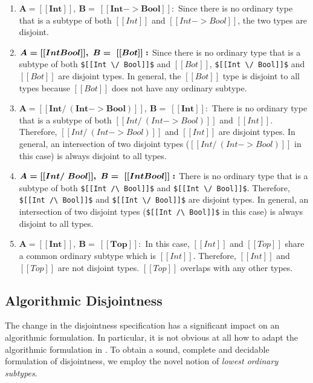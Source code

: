 \begin{enumerate}
  \item $\boldsymbol{A = [[Int]], \ B = \ [[Int -> Bool]]:}$ Since there is no ordinary type that is a subtype of both $[[Int]]$ and $[[Int -> Bool]]$,
        the two types are disjoint.
  \item $\boldsymbol{A = [[Int \/ Bool]], \ B = \ [[Bot]]:}$ Since there is no ordinary type that is a subtype of both \lstinline{$[[Int \/ Bool]]$} and $[[Bot]]$,
    \lstinline{$[[Int \/ Bool]]$} and $[[Bot]]$ are disjoint types.
    In general, the $[[Bot]]$ type is disjoint to all types because $[[Bot]]$ does not
    have any ordinary subtype.
 \item $\boldsymbol{A = [[Int /\ (Int -> Bool)]], \ B = \ [[Int]]:}$ There is no ordinary type that is a subtype of both $[[Int /\ (Int -> Bool)]]$ and $[[Int]]$.
       Therefore, $[[Int /\ (Int -> Bool)]]$ and $[[Int]]$ are disjoint types.
       In general, an intersection of two disjoint types ($[[Int /\ (Int -> Bool)]]$ in this case)
       is always disjoint to all types.
  \item $\boldsymbol{A = [[Int /\ Bool]], \ B = \ [[Int \/ Bool]]:}$ There is no ordinary type that is a subtype of both \lstinline{$[[Int /\ Bool]]$} and \lstinline{$[[Int \/ Bool]]$}.
        Therefore, \lstinline{$[[Int /\ Bool]]$} and \lstinline{$[[Int \/ Bool]]$} are disjoint types.
        In general, an intersection of two disjoint types (\lstinline{$[[Int /\ Bool]]$} in this case)
        is always disjoint to all types.
  \item $\boldsymbol{A = [[Int]], \ B = \ [[Top]]:}$ In this case, $[[Int]]$ and $[[Top]]$ share a common ordinary subtype which is $[[Int]]$.
    Therefore, $[[Int]]$ and $[[Top]]$ are not disjoint types.
     $[[Top]]$ overlaps with any other types.
\end{enumerate}


\subsection{Algorithmic Disjointness}

The change in the disjointness specification has a significant impact on an
algorithmic formulation. In particular, it is not obvious at all how to adapt
the algorithmic formulation in . To obtain a
sound, complete and decidable formulation of disjointness, we employ the novel
notion of \emph{lowest ordinary subtypes}.

